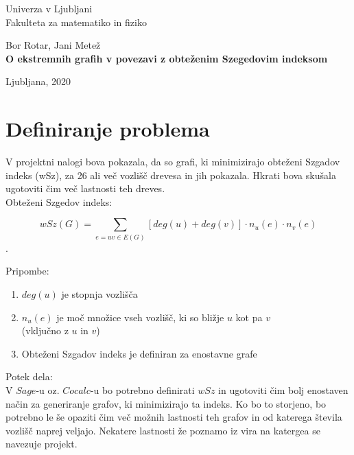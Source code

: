 \documentclass[12pt, a4paper]{article}
\begin{document}
\begin{titlepage}
\begin{center}

\large
Univerza v Ljubljani\\
\normalsize
Fakulteta za matematiko in fiziko\\

\vspace{3 cm} 

\large
Bor Rotar, Jani Metež\\

\vspace{3 cm}
\LARGE
\textbf{O ekstremnih grafih v povezavi z obteženim Szegedovim indeksom}

\vfill

\large Ljubljana, 2020

\end{center}
\end{titlepage}

\newpage

\section[Definiranje problema]{Definiranje problema}

V projektni nalogi bova pokazala, da so grafi, ki minimizirajo obteženi Szgadov indeks (wSz), za 26 ali več vozlišč drevesa in jih pokazala. Hkrati bova skušala ugotoviti čim več lastnosti teh dreves.\\

Obteženi Szgedov indeks:
\begin{center}
 $$wSz(G) =\sum_{e=uv \in E(G)}[deg(u)+ deg(v) ]\cdot n_{u}(e)\cdot n_{v}(e)$$.
\end{center}
\medskip
Pripombe:
\begin{enumerate}
\item $deg(u)$ je stopnja vozlišča
\item $n_{u}(e)$ je moč množice vseh vozlišč, ki so bližje $u$ kot pa $v$ \\ (vključno z $u$ in $v$)
\item Obteženi Szgadov indeks je definiran za enostavne grafe
\end{enumerate}
\medskip

\medskip
Potek dela: \\

V $Sage$-u oz. $Cocalc$-u bo potrebno definirati $wSz$ in ugotoviti čim bolj enostaven način za generiranje grafov, ki minimizirajo ta indeks. Ko bo to storjeno, bo potrebno le še opaziti čim več možnih lastnosti teh grafov in od katerega števila vozlišč naprej veljajo. Nekatere lastnosti že poznamo iz vira na katergea se navezuje projekt.
\end{document}
